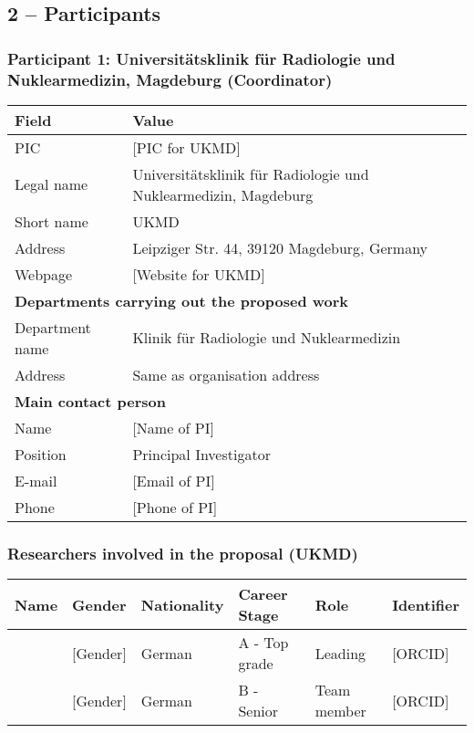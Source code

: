 \documentclass[11pt, a4paper]{article}
\begin{document}
\subsection*{2 – Participants}

\subsubsection*{Participant 1: Universitätsklinik für Radiologie und Nuklearmedizin, Magdeburg (Coordinator)}
\begin{tabular}{p{} p{}}
\toprule
\textbf{Field} & \textbf{Value} \\
\midrule
PIC & [PIC for UKMD] \\
Legal name & Universitätsklinik für Radiologie und Nuklearmedizin, Magdeburg \\
Short name & UKMD \\
Address & Leipziger Str. 44, 39120 Magdeburg, Germany \\
Webpage & [Website for UKMD] \\
\midrule
\multicolumn{2}{l}{\textbf{Departments carrying out the proposed work}} \\
\midrule
Department name & Klinik für Radiologie und Nuklearmedizin \\
Address & Same as organisation address \\
\midrule
\multicolumn{2}{l}{\textbf{Main contact person}} \\
\midrule
Name & [Name of PI] \\
Position & Principal Investigator \\
E-mail & [Email of PI] \\
Phone & [Phone of PI] \\
\bottomrule
\end{tabular}

\subsubsection*{Researchers involved in the proposal (UKMD)}
\begin{tabular}{p{} p{} p{} p{} p{} p{}}
\toprule
\textbf{Name} & \textbf{Gender} & \textbf{Nationality} & \textbf{Career Stage} & \textbf{Role} & \textbf{Identifier} \\
\midrule
[Name of PI] & [Gender] & German & A - Top grade & Leading & [ORCID] \\
[Name of Co-PI] & [Gender] & German & B - Senior & Team member & [ORCID] \\
\bottomrule
\end{tabular}
\end{document}
